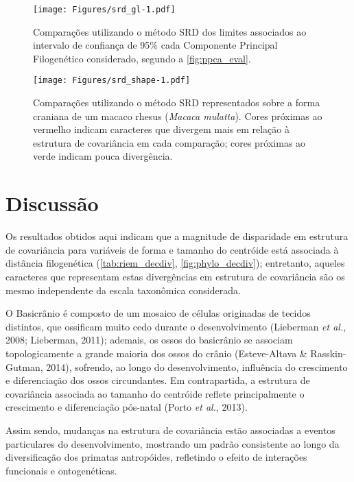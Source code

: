 \documentclass[11pt,twoside]{report}
\begin{document}
\begin{figure}[htbp]
\centering
\texttt{[image: Figures/srd\_gl-1.pdf]}
\caption{Comparações utilizando o método SRD dos limites associados ao
intervalo de confiança de 95\% cada Componente Principal Filogenético
considerado, segundo a \autoref{fig:ppca_eval}. \label{fig:srd_gl}}
\end{figure}

\begin{figure}[htbp]
\centering
\texttt{[image: Figures/srd\_shape-1.pdf]}
\caption{Comparações utilizando o método SRD representados sobre a forma
craniana de um macaco rhesus (\emph{Macaca mulatta}). Cores próximas ao
vermelho indicam caracteres que divergem mais em relação à estrutura de
covariância em cada comparação; cores próximas ao verde indicam pouca
divergência. \label{fig:srd_shape}}
\end{figure}

\section{Discussão}\label{discussao}

Os resultados obtidos aqui indicam que a magnitude de disparidade em
estrutura de covariância para variáveis de forma e tamanho do centróide
está associada à distância filogenética (\autoref{tab:riem_decdiv},
\autoref{fig:phylo_decdiv}); entretanto, aqueles caracteres que
representam estas divergências em estrutura de covariância são os mesmo
independente da escala taxonômica considerada.

O Basicrânio é composto de um mosaico de células originadas de tecidos
distintos, que ossificam muito cedo durante o desenvolvimento (Lieberman
\emph{et al.}, 2008; Lieberman, 2011); ademais, os ossos do basicrânio
se associam topologicamente a grande maioria dos ossos do crânio
(Esteve-Altava \& Rasskin-Gutman, 2014), sofrendo, ao longo do
desenvolvimento, influência do crescimento e diferenciação dos ossos
circundantes. Em contrapartida, a estrutura de covariância associada ao
tamanho do centróide reflete principalmente o crescimento e
diferenciação pós-natal (Porto \emph{et al.}, 2013).

Assim sendo, mudanças na estrutura de covariância estão associadas a
eventos particulares do desenvolvimento, mostrando um padrão consistente
ao longo da diversificação dos primatas antropóides, refletindo o efeito
de interações funcionais e ontogenéticas.

\def\sectionautorefname{Seção} \def\chapterautorefname{Capítulo}
\def\figureautorefname{Figura} \def\tableautorefname{Tabela}
\end{document}
